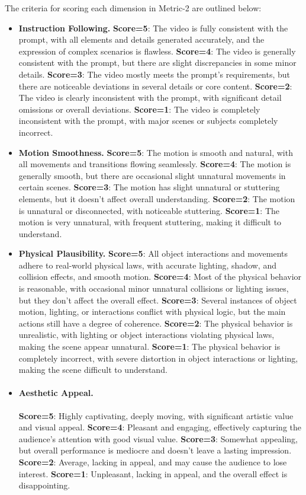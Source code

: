 The criteria for scoring each dimension in Metric-2 are outlined below:
\begin{itemize}[left=0cm] 
\item \textbf{Instruction Following.} 
\textbf{Score=5}: The video is fully consistent with the prompt, with all elements and details generated accurately, and the expression of complex scenarios is flawless. 
\textbf{Score=4}: The video is generally consistent with the prompt, but there are slight discrepancies in some minor details. 
\textbf{Score=3}: The video mostly meets the prompt’s requirements, but there are noticeable deviations in several details or core content. 
\textbf{Score=2}: The video is clearly inconsistent with the prompt, with significant detail omissions or overall deviations. 
\textbf{Score=1}: The video is completely inconsistent with the prompt, with major scenes or subjects completely incorrect.


\item \textbf{Motion Smoothness.}
\textbf{Score=5}: The motion is smooth and natural, with all movements and transitions flowing seamlessly.
\textbf{Score=4}: The motion is generally smooth, but there are occasional slight unnatural movements in certain scenes.
\textbf{Score=3}: The motion has slight unnatural or stuttering elements, but it doesn’t affect overall understanding.
\textbf{Score=2}: The motion is unnatural or disconnected, with noticeable stuttering.
\textbf{Score=1}: The motion is very unnatural, with frequent stuttering, making it difficult to understand.

\item \textbf{Physical Plausibility.}
\textbf{Score=5}: All object interactions and movements adhere to real-world physical laws, with accurate lighting, shadow, and collision effects, and smooth motion.
\textbf{Score=4}: Most of the physical behavior is reasonable, with occasional minor unnatural collisions or lighting issues, but they don’t affect the overall effect.
\textbf{Score=3}: Several instances of object motion, lighting, or interactions conflict with physical logic, but the main actions still have a degree of coherence.
\textbf{Score=2}: The physical behavior is unrealistic, with lighting or object interactions violating physical laws, making the scene appear unnatural.
\textbf{Score=1}: The physical behavior is completely incorrect, with severe distortion in object interactions or lighting, making the scene difficult to understand.

\item \paragraph{Aesthetic Appeal.}
\textbf{Score=5}: Highly captivating, deeply moving, with significant artistic value and visual appeal.
\textbf{Score=4}: Pleasant and engaging, effectively capturing the audience’s attention with good visual value.
\textbf{Score=3}: Somewhat appealing, but overall performance is mediocre and doesn’t leave a lasting impression.
\textbf{Score=2}: Average, lacking in appeal, and may cause the audience to lose interest.
\textbf{Score=1}: Unpleasant, lacking in appeal, and the overall effect is disappointing.
\end{itemize}


